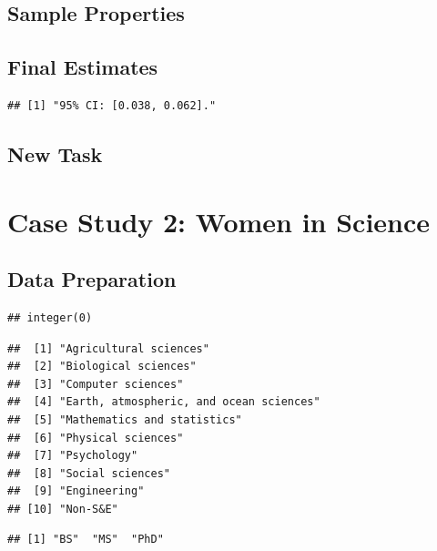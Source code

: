 \documentclass[
  12pt,
]{article}
\begin{document}
\hypertarget{sample-properties}{%
\subsection{Sample Properties}\label{sample-properties}}

\hypertarget{final-estimates}{%
\subsection{Final Estimates}\label{final-estimates}}

\begin{verbatim}
## [1] "95% CI: [0.038, 0.062]."
\end{verbatim}

\hypertarget{new-task}{%
\subsection{New Task}\label{new-task}}

\hypertarget{case-study-2-women-in-science}{%
\section{Case Study 2: Women in
Science}\label{case-study-2-women-in-science}}

\hypertarget{data-preparation-1}{%
\subsection{Data Preparation}\label{data-preparation-1}}

\begin{verbatim}
## integer(0)
\end{verbatim}

\begin{verbatim}
##  [1] "Agricultural sciences"                 
##  [2] "Biological sciences"                   
##  [3] "Computer sciences"                     
##  [4] "Earth, atmospheric, and ocean sciences"
##  [5] "Mathematics and statistics"            
##  [6] "Physical sciences"                     
##  [7] "Psychology"                            
##  [8] "Social sciences"                       
##  [9] "Engineering"                           
## [10] "Non-S&E"
\end{verbatim}

\begin{verbatim}
## [1] "BS"  "MS"  "PhD"
\end{verbatim}
\end{document}
